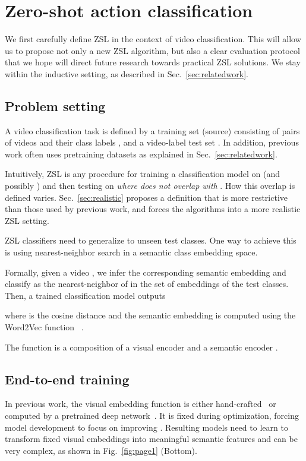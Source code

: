 \documentclass[10pt,twocolumn,letterpaper]{article}
\begin{document}
\section{Zero-shot action classification}\label{sec:methods}
We first carefully define ZSL in the context of video classification. This will allow us to propose not only a new ZSL algorithm, but also a clear evaluation protocol that we hope will direct future research towards practical ZSL solutions. We stay within the inductive setting, as described in Sec.~\ref{sec:relatedwork}.

\subsection{Problem setting}\label{sec:problem}
A video classification task is defined by a training set (source)  consisting of pairs of videos  and their class labels , and a \mbox{video-label} test set . In addition, previous work often uses pretraining datasets  as explained in Sec.~\ref{sec:relatedwork}. 

Intuitively, ZSL is any procedure for training a classification model on  (and possibly ) and then testing on  \emph{where  does not overlap with }. How this overlap is defined varies. Sec.~\ref{sec:realistic} proposes a definition that is more restrictive than those used by previous work, and forces the algorithms into a more realistic ZSL setting.

ZSL classifiers need to generalize to unseen test classes. One way to achieve this is using nearest-neighbor search in a semantic class embedding space.

Formally, given a video , we infer the corresponding semantic embedding  and classify  as the nearest-neighbor of  in the set of embeddings of the test classes. Then, a trained classification model  outputs

where  is the cosine distance and the semantic embedding is computed using the Word2Vec function~\cite{word2vec} .

 The function  is a composition of a visual encoder  and a semantic encoder .

\subsection{End-to-end training}\label{sec:e2e}
In previous work, the visual embedding function  is either hand-crafted~\cite{xu2016multi, uar} or computed by a pretrained deep network~\cite{tarn, action2vec, wang2017zero, uar}. It is fixed during optimization, forcing model development to focus on improving . Resulting models need to learn to transform fixed visual embeddings into meaningful semantic features and can be very complex, as shown in Fig.~\ref{fig:page1} (Bottom).
 
\end{document}
